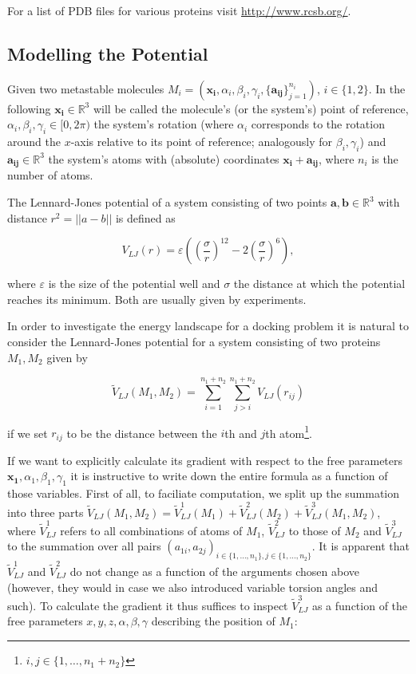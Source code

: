 For a list of PDB files for various proteins visit \url{http://www.rcsb.org/}.

\subsection{Modelling the Potential}
Given two metastable molecules $M_i=(\mathbf{x_i},\alpha_i,\beta_i,\gamma_i,\{\mathbf{a_{ij}}\}_{j=1}^{n_i})$, $i\in\{1,2\}$. In the following $\mathbf{x_i}\in\mathbb R^3$ will be called the molecule's (or the system's) point of reference, $\alpha_i,\beta_i,\gamma_i\in [0,2\pi)$ the system's rotation (where $\alpha_i$ corresponds to the rotation around the $x$-axis relative to its point of reference; analogously for $\beta_i, \gamma_i$) and $\mathbf{a_{ij}}\in\mathbb R^3$ the system's atoms with (absolute) coordinates $\mathbf{x_i}+\mathbf{a_{ij}}$, where $n_i$ is the number of atoms.

The Lennard-Jones potential of a system consisting of two points $\mathbf{a,b}\in\mathbb R^3$ with distance $r^2=||a-b||$ is defined as

\begin{equation}\label{LennardJones}
	V_{LJ}(r) = \varepsilon \left(\left(\frac{\sigma}{r}\right)^{12} - 2 \left(\frac{\sigma}{r}\right)^6\right),
\end{equation}

where $\varepsilon$ is the size of the potential well and $\sigma$ the distance at which the potential reaches its minimum. Both are usually given by experiments.

In order to investigate the energy landscape for a docking problem it is natural to consider the Lennard-Jones potential for a system consisting of two proteins $M_1,M_2$ given by

\begin{equation}\label{LennardJonesOf2Proteins}
	\tilde V_{LJ}(M_1,M_2) = \sum_{i=1}^{n_1+n_2}\sum_{j>i}^{n_1+n_2} V_{LJ}(r_{ij})
\end{equation}

if we set $r_{ij}$ to be the distance between the $i$th and $j$th atom\footnote{$i,j\in\{1,\dots,n_1+n_2\}$}.

If we want to explicitly calculate its gradient with respect to the free parameters $\mathbf{x_1},\alpha_1,\beta_1,\gamma_1$ it is instructive to write down the entire formula as a function of those variables.
First of all, to faciliate computation, we split up the summation into three parts $\tilde V_{LJ}(M_1,M_2) = \tilde V_{LJ}^1(M_1)+\tilde V_{LJ}^2(M_2)+\tilde V_{LJ}^3(M_1,M_2)$, where $\tilde V_{LJ}^1$ refers to all combinations of atoms of $M_1$, $\tilde V_{LJ}^2$ to those of $M_2$ and $\tilde V_{LJ}^3$ to the summation over all pairs $(a_{1i},a_{2j})_{i\in\{1,\dots,n_1\}, j\in\{1,\dots,n_2\}}$.
It is apparent that $\tilde V_{LJ}^1$ and $\tilde V_{LJ}^2$ do not change as a function of the arguments chosen above (however, they would in case we also introduced variable torsion angles and such).
To calculate the gradient it thus suffices to inspect $\tilde V_{LJ}^3$ as a function of the free parameters $x,y,z,\alpha,\beta,\gamma$ describing the position of $M_1$:

